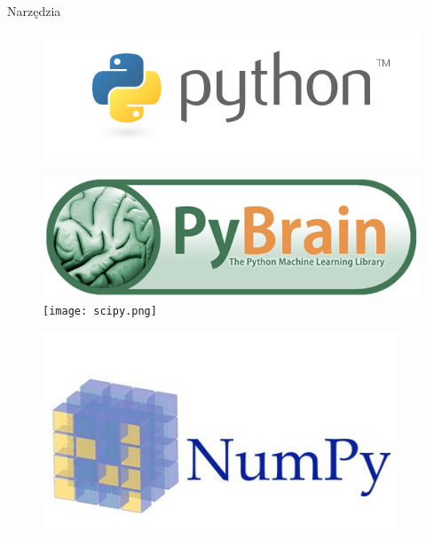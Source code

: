 \documentclass[xcolor=x11names,compress]{beamer}
\renewcommand{\(}{\begin{columns}}
\renewcommand{\)}{\end{columns}}
\newcommand{\<}[1]{\begin{column}{#1}}
\renewcommand{\>}{\end{column}}
\begin{document}
\begin{frame}{Narzędzia}
\begin{itemize}
{\begin{figure}[!htb]
                      \includegraphics[width=\linewidth]{python.png}
                    \endminipage\hfill

                      \includegraphics[width=\linewidth]{pybrain.png}
                    \endminipage\hfill
                      \texttt{[image: scipy.png]}
                    \endminipage

                      \includegraphics[width=\linewidth]{numpy.jpg}
                    \endminipage\hfill

                    \end{figure}			
			}
	\end{itemize}
\end{frame}
\end{document}
